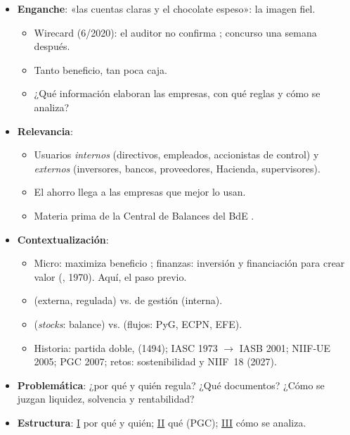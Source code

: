 \documentclass{article}
\begin{document}
\cabecerarepaso
\begin{columnas}

\begin{itemize}
\item \textbf{Enganche}: «las cuentas claras y el chocolate espeso»: la imagen fiel.
  \begin{itemize}
  \item Wirecard (6/2020): el auditor no confirma ; concurso una semana después.
  \item Tanto beneficio, tan poca caja.
  \item ¿Qué información elaboran las empresas, con qué reglas y cómo se analiza?
  \end{itemize}
\item \textbf{Relevancia}:
  \begin{itemize}
  \item Usuarios \emph{internos} (directivos, empleados, accionistas de control) y \emph{externos} (inversores, bancos, proveedores, Hacienda, supervisores).
  \item El ahorro llega a las empresas que mejor lo usan.
  \item Materia prima de la Central de Balances del BdE .
  \end{itemize}
\item \textbf{Contextualización}:
  \begin{itemize}
  \item Micro: maximiza beneficio ; finanzas: inversión  y financiación  para crear valor (, 1970). Aquí, el paso previo.
  \item {} (externa, regulada) vs. de gestión (interna).
  \item {} (\emph{stocks}: balance) vs.  (flujos: PyG, ECPN, EFE).
  \item Historia: partida doble,  (1494); IASC 1973 $\to$ IASB 2001; NIIF-UE 2005; PGC 2007; retos: sostenibilidad y NIIF~18 (2027).
  \end{itemize}
\item \textbf{Problemática}: ¿por qué y quién regula? ¿Qué documentos? ¿Cómo se juzgan liquidez, solvencia y rentabilidad?
\item \textbf{Estructura}: \hyperref[rep:I]{I} por qué y quién; \hyperref[rep:II]{II} qué (PGC); \hyperref[rep:III]{III} cómo se analiza.

\end{itemize}
\end{columnas}
\end{document}
